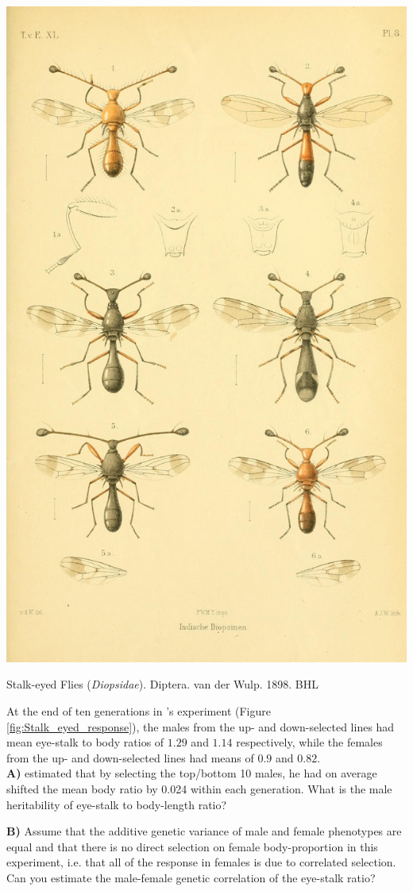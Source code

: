 \begin{marginfigure}[1cm]
\begin{center}
\includegraphics[width=0.9 \textwidth]{illustration_images/Quant_gen/Stalk_eyed_flies/WulpPlateVIIIjpg.jpg}
\end{center}
\caption{Stalk-eyed Flies ({\it Diopsidae}).  Diptera.
van der Wulp. 1898. BHL} \label{fig:Stalk_eyed_flies}  
\end{marginfigure}
\begin{question}

At the end of ten generations in \citeauthor{wilkinson:93}'s experiment (Figure
\ref{fig:Stalk_eyed_response}), the males from the up- and down-selected
lines had mean eye-stalk to body ratios of $1.29$ and $1.14$
respectively, while the females from the up- and down-selected lines
had means of $0.9$ and $0.82$. \\
{\bf A)} \citeauthor{wilkinson:93} estimated that by selecting the top/bottom 10 males, he had on average shifted the mean body ratio by 0.024 within
each generation. What is the male heritability of eye-stalk to body-length ratio?

{\bf B)} Assume that the additive genetic variance of male and female phenotypes are
equal and that there is no direct
selection on female body-proportion in this experiment, i.e. that all of
the response in females is due to correlated selection. Can you
estimate the male-female genetic correlation of the eye-stalk ratio? 
\end{question}



